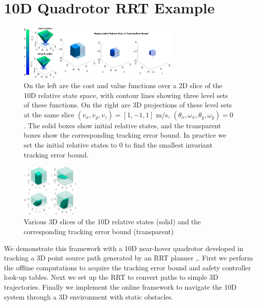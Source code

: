 \section{10D Quadrotor RRT Example \label{sec:results}}
\begin{figure}
	\centering
	\includegraphics[width=0.7\textwidth]{fig/quad10D_example_cost}
	\caption{On the left are the cost and value functions over a 2D slice of the 10D relative state space, with contour lines showing three level sets of these functions. On the right are 3D projections of these level sets at the same slice $(v_{x},v_{y},v_{z})=[1, -1, 1]$ m/s, $(\theta_{x},\omega_{x},\theta_{y},\omega_{y})=0$. The solid boxes show initial relative states, and the transparent boxes show the corresponding tracking error bound. In practice we set the initial relative states to 0 to find the smallest invariant tracking error bound.}
	\label{fig:quad10D_example}
		\vspace{-.2in}
	\end{figure} 
\begin{figure}
	\centering
	\includegraphics[width=0.25\textwidth]{fig/quad10D_slices}
	\caption{Various 3D slices of the 10D relative states (solid) and the corresponding tracking error bound (transparent)}
	\label{fig:quad10D_example_slices}
		\vspace{-.21in}
\end{figure} 
We demonstrate this framework with a 10D near-hover quadrotor developed in \cite{Bouffard12} tracking a 3D point source path generated by an RRT planner \cite{Kuffner2000},\cite{Kavraki1996}. First we perform the offline computations to acquire the tracking error bound and safety controller look-up tables. Next we set up the RRT to convert paths to simple 3D trajectories. Finally we implement the online framework to navigate the 10D system through a 3D environment with static obstacles.

